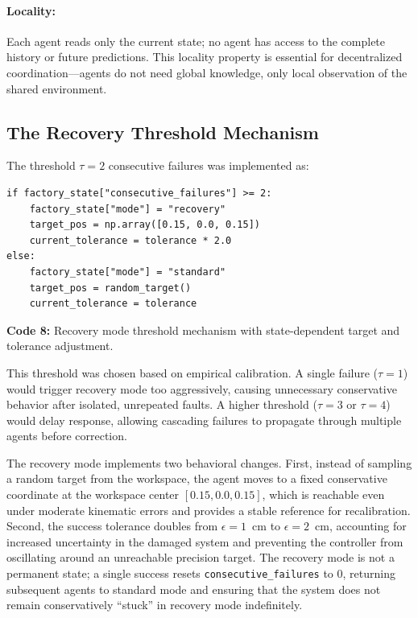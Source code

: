 \documentclass[12pt,a4paper,oneside]{report}
\begin{document}
\paragraph{Locality:} Each agent reads only the current state; no agent has access to the complete history or future predictions. This locality property is essential for decentralized coordination—agents do not need global knowledge, only local observation of the shared environment.

\subsection{The Recovery Threshold Mechanism}
\label{subsec:the_recovery_threshold_mechanism}

The threshold $\tau = 2$ consecutive failures was implemented as:

\begin{verbatim}
if factory_state["consecutive_failures"] >= 2:
    factory_state["mode"] = "recovery"
    target_pos = np.array([0.15, 0.0, 0.15])
    current_tolerance = tolerance * 2.0
else:
    factory_state["mode"] = "standard"
    target_pos = random_target()
    current_tolerance = tolerance
\end{verbatim}
\vspace{0.2cm}
{\small \textbf{Code 8:} Recovery mode threshold mechanism with state-dependent target and tolerance adjustment.\label{code:recovery_threshold}}
\vspace{0.3cm}

This threshold was chosen based on empirical calibration. A single failure ($\tau = 1$) would trigger recovery mode too aggressively, causing unnecessary conservative behavior after isolated, unrepeated faults. A higher threshold ($\tau = 3$ or $\tau = 4$) would delay response, allowing cascading failures to propagate through multiple agents before correction.

The recovery mode implements two behavioral changes. First, instead of sampling a random target from the workspace, the agent moves to a fixed conservative coordinate at the workspace center $[0.15, 0.0, 0.15]$, which is reachable even under moderate kinematic errors and provides a stable reference for recalibration. Second, the success tolerance doubles from $\epsilon = 1$~cm to $\epsilon = 2$~cm, accounting for increased uncertainty in the damaged system and preventing the controller from oscillating around an unreachable precision target. The recovery mode is not a permanent state; a single success resets \texttt{consecutive\_failures} to 0, returning subsequent agents to standard mode and ensuring that the system does not remain conservatively ``stuck'' in recovery mode indefinitely.
\end{document}
